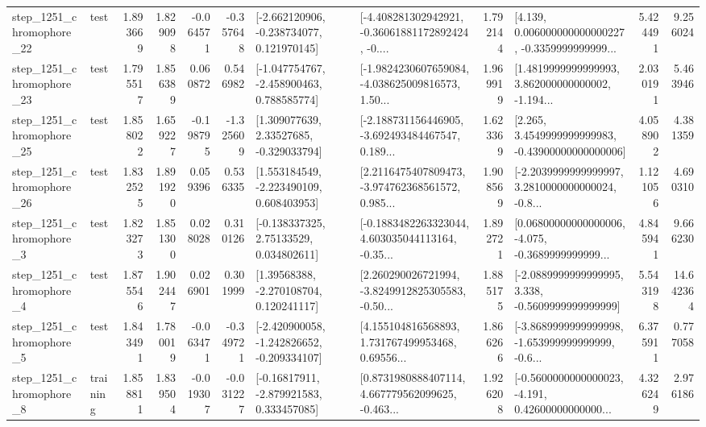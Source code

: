 \begin{tabular}{llrrrrllrlrr}
 step\_1251\_chromophore\_22 &      test &      1.893669 &    1.829098 &     -0.064571 & -0.357648 &   [-2.662120906, -0.238734077, 0.121970145] &  [-4.408281302942921, -0.36061881172892424, -0.... &       1.792144 &  [4.139, 0.006000000000000227, -0.3359999999999... &            5.424491 &          9.256024 \\
 step\_1251\_chromophore\_23 &      test &      1.795517 &    1.856389 &      0.060872 &  0.546982 &   [-1.047754767, -2.458900463, 0.788585774] &  [-1.9824230607659084, -4.038625009816573, 1.50... &       1.969919 &  [1.4819999999999993, 3.862000000000002, -1.194... &            2.030191 &          5.463946 \\
 step\_1251\_chromophore\_25 &      test &      1.858022 &    1.659227 &     -0.198795 & -1.325609 &     [1.309077639, 2.33527685, -0.329033794] &  [-2.188731156446905, -3.692493484467547, 0.189... &       1.623369 &  [2.265, 3.4549999999999983, -0.43900000000000006] &            4.058902 &          4.381359 \\
 step\_1251\_chromophore\_26 &      test &      1.832525 &    1.891920 &      0.059396 &  0.536335 &    [1.553184549, -2.223490109, 0.608403953] &  [2.2116475407809473, -3.974762368561572, 0.985... &       1.908569 &  [-2.2039999999999997, 3.2810000000000024, -0.8... &            1.121056 &          4.690310 \\
  step\_1251\_chromophore\_3 &      test &      1.823273 &    1.851300 &      0.028028 &  0.310126 &     [-0.138337325, 2.75133529, 0.034802611] &  [-0.1883482263323044, 4.603035044113164, -0.35... &       1.892721 &  [0.06800000000000006, -4.075, -0.3689999999999... &            4.845941 &          9.666230 \\
  step\_1251\_chromophore\_4 &      test &      1.875546 &    1.902447 &      0.026901 &  0.301999 &     [1.39568388, -2.270108704, 0.120241117] &  [2.260290026721994, -3.8249912825305583, -0.50... &       1.885175 &  [-2.0889999999999995, 3.338, -0.5609999999999999] &            5.543198 &         14.642364 \\
  step\_1251\_chromophore\_5 &      test &      1.843491 &    1.780019 &     -0.063471 & -0.349721 &  [-2.420900058, -1.242826652, -0.209334107] &  [4.155104816568893, 1.731767499953468, 0.69556... &       1.866266 &  [-3.8689999999999998, -1.653999999999999, -0.6... &            6.375911 &          0.777058 \\
  step\_1251\_chromophore\_8 &  training &      1.858811 &    1.839504 &     -0.019307 & -0.031227 &    [-0.16817911, -2.879921583, 0.333457085] &  [0.8731980888407114, 4.667779562099625, -0.463... &       1.926208 &  [-0.5600000000000023, -4.191, 0.42600000000000... &            4.326249 &          2.976186 \\

\end{tabular}
